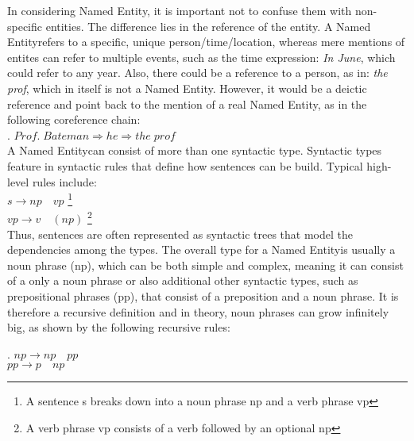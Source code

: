 \documentclass[11pt]{article}
\newcommand{\namedentity}{Named Entity}
\begin{document}
In considering \namedentity, it is important not to confuse them with non-specific entities. %
The difference lies in the reference of the entity. A \namedentity refers to a specific, unique person/time/location, whereas
mere mentions of entites can refer to multiple events, such as the time expression: \emph{In June}, which could refer to any year.
Also, there could be a reference to a person, as in: \emph{the prof}, which in itself is not a \namedentity.
However, it would be a deictic reference and point back to the mention of a real \namedentity, as in the following coreference chain: \\

\ex. $ Prof.\; Bateman \Rightarrow he \Rightarrow the \; prof$ \label{cor}\\

A \namedentity  can consist of more than one syntactic type. Syntactic types feature in syntactic rules that define how sentences can be build.
Typical high-level rules include: \\
$s \rightarrow np\quad vp $ \footnote{ A sentence s breaks down into a noun phrase np and a verb phrase vp} \\
$ vp \rightarrow v\quad (np)$ \footnote{ A verb phrase vp consists of a verb followed by an optional np} \\

Thus, sentences are often represented as syntactic trees that model the dependencies among the types.
The overall type for a \namedentity is usually a noun phrase (np), which can be both simple and complex, meaning it can consist of a only a noun phrase or 
also additional other syntactic types, such as prepositional phrases (pp), that consist of a preposition and a noun phrase. 
It is therefore a recursive definition and in theory, noun phrases can grow infinitely big, as shown by the following recursive rules:  %

\ex. $ np \rightarrow np \quad pp$ \\
     $ pp \rightarrow p \quad np$ 
 
\end{document}

